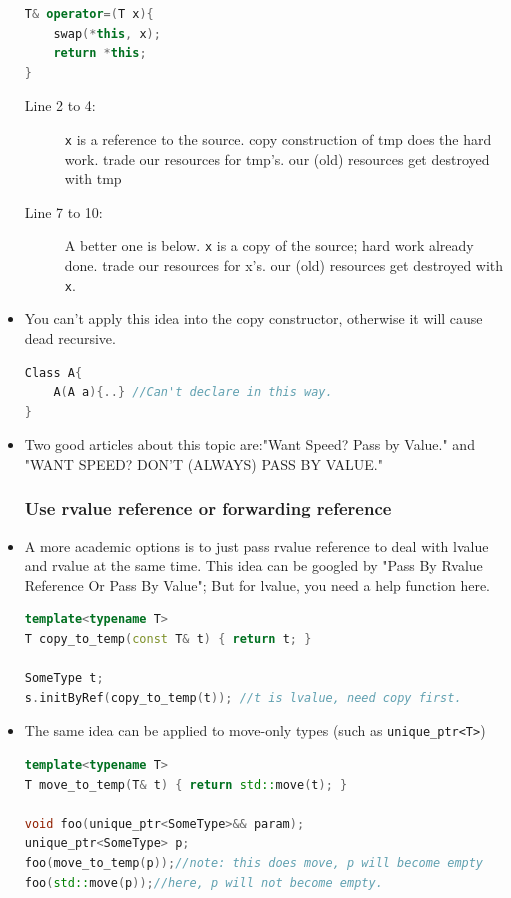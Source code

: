 \documentclass[a4paper,11pt,twoside]{book}
\begin{document}
\begin{itemize}
\begin{lstlisting}[frame=single, language=c++]
T& operator=(T x){ 
	swap(*this, x);
	return *this;   
}
\end{lstlisting}
\begin{description}
	\item[Line 2 to 4:] \texttt{x} is a reference to the source. copy construction of tmp does the hard work. trade our resources for tmp's. our (old) resources get destroyed with tmp 
	
	\item[Line 7 to 10:] A better one is below. \texttt{x} is a copy of the source; hard work already done. trade our resources for x's. our (old) resources get destroyed with \texttt{x}.
\end{description}

\item You can't apply this idea into the copy constructor, otherwise it will cause dead recursive.
\begin{lstlisting}[frame=single, language=c++]
Class A{
	A(A a){..} //Can't declare in this way.
}
\end{lstlisting}

\item Two good articles about this topic are:"Want Speed? Pass by Value." and "WANT SPEED? DON'T (ALWAYS) PASS BY VALUE."

\subsubsection{Use rvalue  reference or forwarding reference}

    \item A more academic options is to just pass rvalue reference to deal with lvalue and rvalue at the same time. This idea can be googled by "Pass By Rvalue Reference Or Pass By Value"; But for lvalue, you need a help function here.
\begin{lstlisting}[frame=single, language=c++]
template<typename T>
T copy_to_temp(const T& t) { return t; }

SomeType t; 
s.initByRef(copy_to_temp(t)); //t is lvalue, need copy first.
\end{lstlisting}

    \item The same idea can be applied to move-only types (such as \texttt{unique\_ptr<T>})
\begin{lstlisting}[frame=single, language=c++]
template<typename T>
T move_to_temp(T& t) { return std::move(t); }

void foo(unique_ptr<SomeType>&& param);
unique_ptr<SomeType> p;
foo(move_to_temp(p));//note: this does move, p will become empty 
foo(std::move(p));//here, p will not become empty.  
\end{lstlisting}



\end{itemize}
\end{document}
